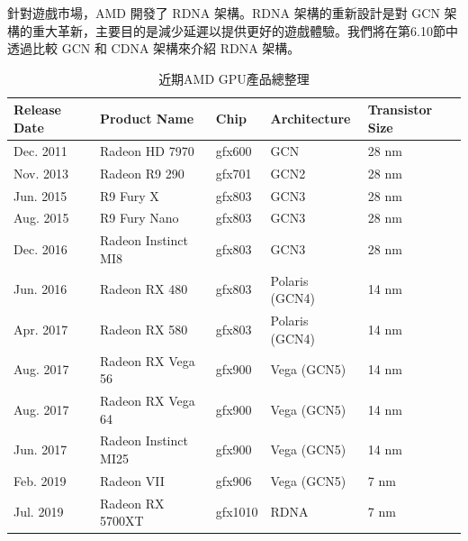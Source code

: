 針對遊戲市場，AMD 開發了 RDNA 架構。RDNA 架構的重新設計是對 GCN 架構的重大革新，主要目的是減少延遲以提供更好的遊戲體驗。我們將在第6.10節中透過比較 GCN 和 CDNA 架構來介紹 RDNA 架構。

\begin{table}[htbp]
    \centering
    \caption{近期AMD GPU產品總整理}
    \label{tab:amd-gpu-summary}
    \begin{tabular}{@{}lllll@{}}
        \toprule
        \textbf{Release Date} & \textbf{Product Name}      & \textbf{Chip} & \textbf{Architecture} & \textbf{Transistor Size} \\ \midrule
        Dec. 2011            & Radeon HD 7970            & gfx600        & GCN                   & 28 nm                    \\
        Nov. 2013            & Radeon R9 290             & gfx701        & GCN2                  & 28 nm                    \\
        Jun. 2015            & R9 Fury X                 & gfx803        & GCN3                  & 28 nm                    \\
        Aug. 2015            & R9 Fury Nano              & gfx803        & GCN3                  & 28 nm                    \\
        Dec. 2016            & Radeon Instinct MI8       & gfx803        & GCN3                  & 28 nm                    \\
        Jun. 2016            & Radeon RX 480             & gfx803        & Polaris (GCN4)        & 14 nm                    \\
        Apr. 2017            & Radeon RX 580             & gfx803        & Polaris (GCN4)        & 14 nm                    \\
        Aug. 2017            & Radeon RX Vega 56         & gfx900        & Vega (GCN5)           & 14 nm                    \\
        Aug. 2017            & Radeon RX Vega 64         & gfx900        & Vega (GCN5)           & 14 nm                    \\
        Jun. 2017            & Radeon Instinct MI25      & gfx900        & Vega (GCN5)           & 14 nm                    \\
        Feb. 2019            & Radeon VII                & gfx906        & Vega (GCN5)           & 7 nm                     \\
        Jul. 2019            & Radeon RX 5700XT          & gfx1010       & RDNA                  & 7 nm                     \\

\end{tabular}
\end{table}
